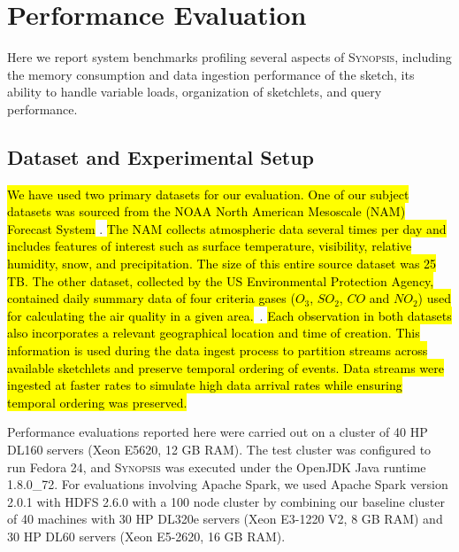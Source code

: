 \section{Performance Evaluation}
Here we report system benchmarks profiling several aspects of \textsc{Synopsis}, including the memory consumption and data ingestion performance of the sketch, its ability to handle variable loads, organization of sketchlets, and query performance.
\label{sec:performance}
\subsection{Dataset and Experimental Setup}
\hl{We have used two primary datasets for our evaluation.
One of our subject datasets was sourced from the NOAA North American Mesoscale (NAM) Forecast System} \cite{noaa_nam}.  \hl{The NAM collects atmospheric data several times per day and includes features of interest such as surface temperature, visibility, relative humidity, snow, and precipitation. The size of this entire source dataset was 25 TB.
The other dataset, collected by the US Environmental Protection Agency, contained daily summary data of four criteria gases ($O_3$, $SO_2$, $CO$ and $NO_2$) used for calculating the air quality in a given area.}~\cite{epa-criteriagases}. \hl{Each observation in both datasets also incorporates a relevant geographical location and time of creation. This information is used during the data ingest process to partition streams across available sketchlets and preserve temporal ordering of events. Data streams were ingested at faster rates to simulate high data arrival rates while ensuring temporal ordering was preserved.}

Performance evaluations reported here were carried out on a cluster of 40 HP DL160 servers (Xeon E5620, 12 GB RAM). The test cluster was configured to run Fedora 24, and \textsc{Synopsis} was executed under the OpenJDK Java runtime 1.8.0\_72.
For evaluations involving Apache Spark, we used Apache Spark version 2.0.1 with HDFS 2.6.0 with a 100 node cluster by combining our baseline cluster of 40 machines with 30 HP DL320e servers (Xeon E3-1220 V2, 8 GB RAM) and 30 HP DL60 servers (Xeon E5-2620, 16 GB RAM). 



